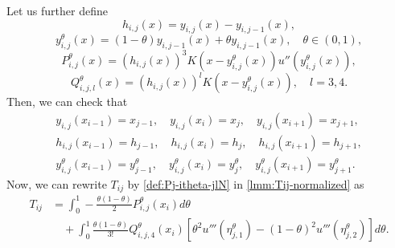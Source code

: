 \documentclass{amsart}
\newtheorem{lemma}[theorem]{Lemma}
\theoremstyle{definition}
\theoremstyle{remark}
\numberwithin{equation}{section}
\begin{document}
Let us further define 
  \begin{equation} \label{def:hij}
    h_{i,j}(x) = y_{i,j}(x) - y_{i,j-1}(x),
  \end{equation}
  \begin{equation} \label{def:yijt}
    y_{i,j}^\theta(x) = (1-\theta) y_{i,j-1}(x) + \theta y_{i,j-1}(x), \quad \theta \in (0, 1),
  \end{equation}
  \begin{equation} \label{def:Pj-itheta-jlN}
    {P_{i,j}^\theta}(x) = ({h_{i,j}}(x))^3  K(x - {y_{i,j}^\theta}(x) ) u''({y_{i,j}^\theta}(x)),
  \end{equation}
  \begin{equation} \label{def:Qj-itheta-jlN}
    {Q_{i,j,l}^{\theta}}(x) = ({h_{i,j}}(x))^l K(x - {y_{i,j}^\theta}(x)), \quad l=3, 4.
  \end{equation}
Then, we can check that
\begin{equation} \label{eq:prop-of-GMFs}
    \begin{gathered}
      y_{i,j}(x_{i-1}) = x_{j-1}, \quad y_{i,j}(x_{i}) = x_{j}, \quad y_{i,j}(x_{i+1}) = x_{j+1}, \\
      h_{i,j}(x_{i-1}) = h_{j-1}, \quad h_{i,j}(x_{i}) = h_j, \quad h_{i,j}(x_{i+1}) = h_{j+1}, \\
      y_{i,j}^\theta(x_{i-1}) = y_{j-1}^\theta, \quad y_{i,j}^\theta(x_{i}) = y_{j}^\theta, \quad y_{i,j}^\theta(x_{i+1}) = y_{j+1}^\theta.
    \end{gathered}
\end{equation}
Now, we can rewrite \(T_{ij}\) by \eqref{def:Pj-itheta-jlN} in \eqref{lmm:Tij-normalized} as
  \begin{equation} \label{lmm:Tij-express-as-int-of-function}
    \begin{aligned}
      T_{ij} & = \int_{0}^{1} -\frac{\theta (1-\theta)}{2} {P_{i,j}^\theta}(x_i) d\theta    \\
             & \quad + \int_{0}^{1} \frac{\theta (1-\theta)}{3!}{Q_{i,j,4}^\theta}(x_i) \left[ \theta^2  u'''(\eta_{j,1}^\theta) - (1-\theta)^2 u'''(\eta_{j,2}^\theta) \right] d\theta.
    \end{aligned}
  \end{equation}
\end{document}
